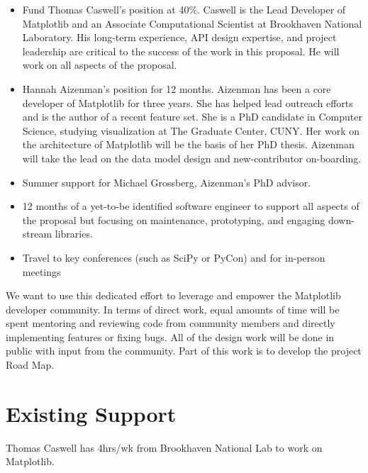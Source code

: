 \documentclass[11pt,letterpaper]{article}  %
\begin{document}
\begin{itemize}[noitemsep]

\item Fund Thomas Caswell's position at 40\%.  Caswell is the Lead Developer of Matplotlib and an Associate
  Computational Scientist at Brookhaven National Laboratory.  His
  long-term experience, API design expertise, and project leadership
  are critical to the success of the work in this proposal.  He will work
  on all aspects of the proposal.
\item Hannah Aizenman's position for 12 months.  Aizenman has
  been a core developer of Matplotlib for three years. She has helped
  lead outreach efforts and is the author of a recent feature set.
  She is a PhD candidate in Computer Science, studying visualization at The
  Graduate Center, CUNY. Her work on the architecture of Matplotlib will be
  the basis of her PhD thesis. Aizenman will take
  the lead on the data model design and new-contributor on-boarding.
\item Summer support for Michael Grossberg, Aizenman's PhD advisor.
\item 12 months of a yet-to-be identified software engineer to support all aspects of the proposal but focusing on maintenance, prototyping, and engaging down-stream libraries.
\item Travel to key conferences (such as SciPy or PyCon) and for in-person meetings
\end{itemize}

We want to use this dedicated effort to leverage and empower the Matplotlib developer community.  In terms of direct work, equal amounts of time will be spent mentoring and reviewing code from community members and directly implementing features or fixing bugs.  All of the design work will be done in public with
input from the community. Part of this work is to develop the project Road Map.



\section{Existing Support}
Thomas Caswell has 4hrs/wk from Brookhaven National Lab to work on Matplotlib.


\clearpage

\end{document}
